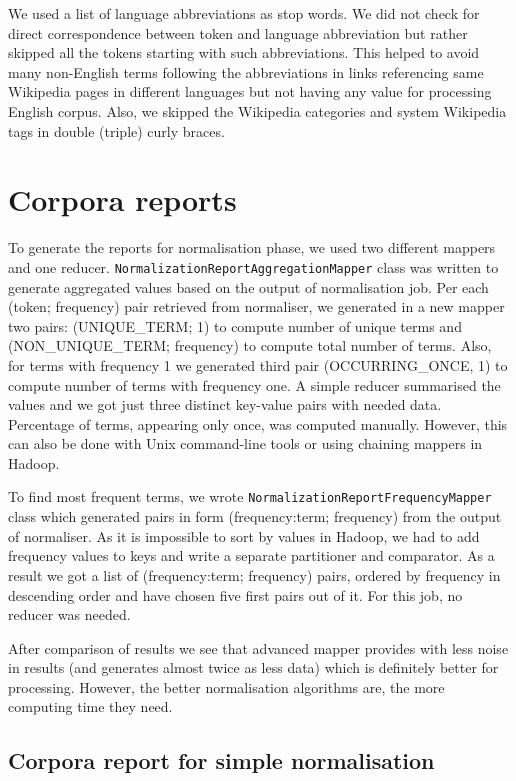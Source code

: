 \documentclass[a4paper, notitlepage]{report}
\begin{document}
We used a list of language abbreviations as stop words. We did not check for direct correspondence between token and language abbreviation but rather skipped all the tokens starting with such abbreviations. This helped to avoid many non-English terms following the abbreviations in links referencing same Wikipedia pages in different languages but not having any value for processing English corpus. Also, we skipped the Wikipedia categories and system Wikipedia tags in double (triple) curly braces.

\section{Corpora reports}

To generate the reports for normalisation phase, we used two different mappers and one reducer. \lstinline{NormalizationReportAggregationMapper} class was written to generate aggregated values based on the output of normalisation job. Per each (token; frequency) pair retrieved from normaliser, we generated in a new mapper two pairs: (UNIQUE\_TERM; 1) to compute number of unique terms and (NON\_UNIQUE\_TERM; frequency) to compute total number of terms. Also, for terms with frequency 1 we generated third pair (OCCURRING\_ONCE, 1) to compute number of terms with frequency one. A simple reducer summarised the values and we got just three distinct key-value pairs with needed data. Percentage of terms, appearing only once, was computed manually. However, this can also be done with Unix command-line tools or using chaining mappers in Hadoop.

To find most frequent terms, we wrote \lstinline{NormalizationReportFrequencyMapper} class which generated pairs in form (frequency:term; frequency) from the output of normaliser. As it is impossible to sort by values in Hadoop, we had to add frequency values to keys and write a separate partitioner and comparator. As a result we got a list of (frequency:term; frequency) pairs, ordered by frequency in descending order and have chosen five first pairs out of it. For this job, no reducer was needed.

After comparison of results we see that advanced mapper provides with less noise in results (and generates almost twice as less data) which is definitely better for processing. However, the better normalisation algorithms are, the more computing time they need.  

\subsection{Corpora report for simple normalisation}
\end{document}
